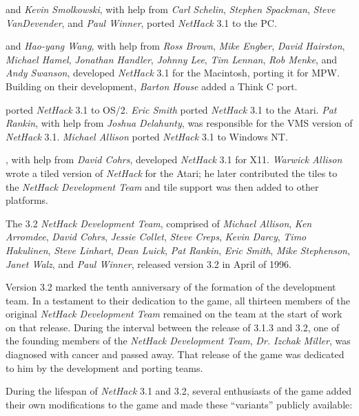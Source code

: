 \medskip
{} and {\it Kevin Smolkowski}, with help from
{\it Carl Schelin}, {\it Stephen Spackman}, {\it Steve VanDevender},
and {\it Paul Winner}, ported {\it NetHack\/} 3.1 to the PC.

\medskip
{} and {\it Hao-yang Wang},
with help from {\it Ross Brown}, {\it Mike Engber}, {\it David Hairston},
{\it Michael Hamel}, {\it Jonathan Handler}, {\it Johnny Lee},
{\it Tim Lennan}, {\it Rob Menke}, and {\it Andy Swanson},
developed {\it NetHack\/} 3.1 for the Macintosh, porting it for MPW.
Building on their development, {\it Barton House} added a Think C port.

\medskip
{} ported {\it NetHack\/} 3.1 to OS/2.
{\it Eric Smith\/} ported {\it NetHack\/} 3.1 to the Atari.
{\it Pat Rankin}, with help from {\it Joshua Delahunty},
was responsible for the VMS version of {\it NetHack\/} 3.1.
{\it Michael Allison} ported {\it NetHack\/} 3.1 to Windows NT.

\medskip
{}, with help from {\it David Cohrs}, developed {\it NetHack\/}
3.1 for X11.
{\it Warwick Allison} wrote a tiled version of {\it NetHack\/} for the Atari;
he later contributed the tiles to the {\it NetHack Development Team} and tile support was
then added to other platforms.

\medskip
\nd The 3.2 {\it NetHack Development Team}, comprised of {\it Michael Allison}, {\it Ken
Arromdee}, {\it David Cohrs}, {\it Jessie Collet}, {\it Steve Creps}, {\it
Kevin Darcy}, {\it Timo Hakulinen}, {\it Steve Linhart}, {\it Dean Luick},
{\it Pat Rankin}, {\it Eric Smith}, {\it Mike Stephenson}, {\it Janet Walz},
and {\it Paul Winner}, released version 3.2 in April of 1996.

\medskip
\nd Version 3.2 marked the tenth anniversary of the formation of the development
team.  In a testament to their dedication to the game, all thirteen members
of the original {\it NetHack Development Team} remained on the team at the start of work on
that release.  During the interval between the release of 3.1.3 and 3.2,
one of the founding members of the {\it NetHack Development Team}, {\it Dr. Izchak Miller},
was diagnosed with cancer and passed away.  That release of the game was
dedicated to him by the development and porting teams.

\medskip
During the lifespan of {\it NetHack\/} 3.1 and 3.2, several enthusiasts
of the game added
their own modifications to the game and made these ``variants'' publicly
available:

